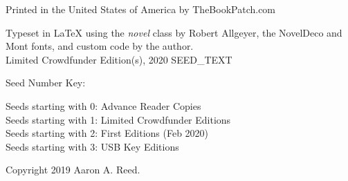 \thispagestyle{empty}

\NewFontFamily{}
\vspace*{6\nbs}
\begin{center}
{\mont {}}
\end{center}
\clearpage

\thispagestyle{empty}
\null %
\clearpage

\thispagestyle{empty}
\vspace*{6\nbs}
\begin{center}
{\mont {}}

\vspace*{3\nbs}

{\mont {}}

\vfill
Printed in the United States of America by TheBookPatch.com

\end{center}
\clearpage

\thispagestyle{empty}
\null\vfill

\begin{legalese}
Typeset in LaTeX using the \textit{novel} class by Robert Allgeyer, the NovelDeco and Mont fonts, and custom code by the author. \\
\vspace{1\nbs}
Limited Crowdfunder Edition(s), 2020
\vspace{1\nbs}
SEED_TEXT \\

\vspace{1\nbs}

\begin{parascale}[0.88]
Seed Number Key: \\
\begin{adjustwidth}{2em}{2em}
Seeds starting with 0: Advance Reader Copies \\
Seeds starting with 1: Limited Crowdfunder Editions \\
Seeds starting with 2: First Editions (Feb 2020) \\
Seeds starting with 3: USB Key Editions
\end{adjustwidth}
\end{parascale}
\vspace{1\nbs}

Copyright 2019 Aaron A. Reed.
\end{legalese}
\clearpage


